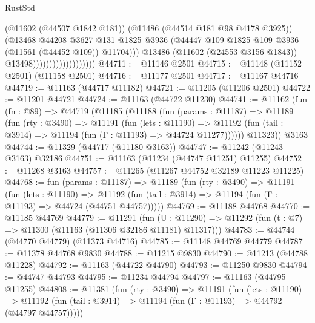 \begin{lexlean}{RustStd}
\begin{coremodule}
                                            (@11602 (@44507 @1842 @181))
                                            (@11486 (@44514 @181 @98 @4178 @3925))
                                            (@13468
                                              @44208
                                              @3627
                                              @131
                                              @1825
                                              @3936
                                              (@44447
                                                @109
                                                @1825
                                                @109
                                                @3936
                                                (@11561 (@44452 @109))
                                                @11704)))
                                          @13486
                                          (@11602 (@24553 @3156 @1843))
                                          @13498)))))))))))))))))))
@44711 := @11146 @2501
@44715 := @11148 (@11152 @2501) (@11158 @2501)
@44716 := @11177 @2501
@44717 := @11167 @44716
@44719 := @11163 (@44717 @11182)
@44721 := @11205 (@11206 @2501)
@44722 := @11201 @44721
@44724 := @11163 (@44722 @11230)
@44741 := @11162
    (fun (fn : @89) =>
    @44719
      (@11185
        (@11188
          (fun (params : @11187) =>
          @11189
            (fun (rty : @3490) =>
            @11191
              (fun (lets : @11190) =>
              @11192 (fun (tail : @3914) => @11194 (fun (Γ : @11193) => @44724 @11277))))))
        @11323))
    @3163
@44744 := @11329 (@44717 (@11180 @3163))
@44747 := @11242 (@11243 @3163) @32186
@44751 := @11163 (@11234 (@44747 @11251) @11255)
@44752 := @11268 @3163
@44757 := @11265 (@11267 @44752 @32189 @11223 @11225)
@44768 := fun (params : @11187) =>
  @11189
    (fun (rty : @3490) =>
    @11191
      (fun (lets : @11190) =>
      @11192 (fun (tail : @3914) => @11194 (fun (Γ : @11193) => @44724 (@44751 @44757)))))
@44769 := @11188 @44768
@44770 := @11185 @44769
@44779 := @11291
    (fun (U : @11290) => @11292 (fun (t : @7) => @11300 (@11163 (@11306 @32186 @11181) @11317)))
@44783 := @44744 (@44770 @44779) (@11373 @44716)
@44785 := @11148 @44769 @44779
@44787 := @11378 @44768 @9830
@44788 := @11215 @9830
@44790 := @11213 (@44788 @11228)
@44792 := @11163 (@44722 @44790)
@44793 := @11250 @9830
@44794 := @44747 @44793
@44795 := @11234 @44794
@44797 := @11163 (@44795 @11255)
@44808 := @11381
    (fun (rty : @3490) =>
    @11191
      (fun (lets : @11190) =>
      @11192 (fun (tail : @3914) => @11194 (fun (Γ : @11193) => @44792 (@44797 @44757)))))

\end{coremodule}
\end{lexlean}
